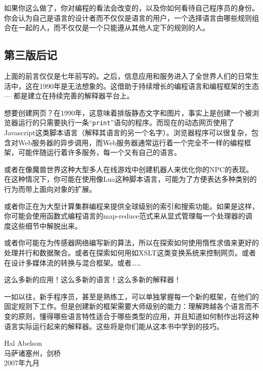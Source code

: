 如果你这么做了，你对编程的看法会改变的，以及你如何看待自己程序员的身份。你会认为自己是语言的设计者而不仅仅是语言的用户，一个选择语言由哪些规则组合在一起的人，而不仅仅是一个只能遵从其他人定下的规则的人。

\subsection*{第三版后记}

上面的前言仅仅是七年前写的。之后，信息应用和服务进入了全世界人们的日常生活中，这在1990年是无法想象的。这借助于持续增长的编程语言和编程框架的生态 --- 都是建立在持续完善的解释器平台上。

想要创建网页？在1990年，这意味着排版静态文字和图片，事实上是创建一个被浏览器运行的只需要执行一条``\texttt{print}''语句的程序。而现在的动态网页使用了Javascript这类脚本语言（解释其语言的另一个名字）。浏览器程序可以很复杂，包含对Web服务器的异步调用，而Web服务器通常运行着一个完全不一样的编程框架，可能伴随运行着许多服务，每一个又有自己的语言。

或者在像魔兽世界这种大型多人在线游戏中创建机器人来优化你的NPC的表现。在这种情况下，你可能在使用像Lua这种脚本语言，可能为了方便表达多种类别的行为而带上面向对象的扩展。

或者你正在为大型计算集群编程来提供全球级别的索引和搜索功能。如果是这样，你可能会使用函数式编程语言的map-reduce范式来从显式管理每一个处理器的调度这些细节中解脱出来。

或者你可能在为传感器网络编写新的算法，所以在探索如何使用惰性求值来更好的处理并行和数据聚合。或者在探索如何用如XSLT这类变换系统来控制网页。或者在设计多媒体流的转换与混合框架。或者……

这么多新的应用！这么多新的语言！这么多新的解释器！

一如以往，新手程序员，甚至是熟练工，可以单独掌握每一个新的框架，在他们的固定规则下工作。但是创建新的框架需要大师级别的能力：理解跨越各个语言而不变的原则，懂得哪些语言特性适合于哪些类型的应用，并且知道如何制作出将这种语言实际运行起来的解释器。这些将是你们能从这本书中学到的技巧。

{
\setlength{\parindent}{0pt}
\vspace{30pt}
Hal Abelson\\
马萨诸塞州，剑桥\\
2007年九月
}

